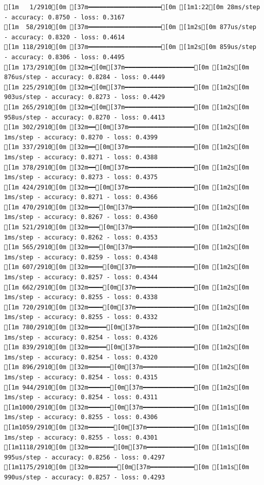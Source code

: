 \documentclass[
  letterpaper,
  DIV=11,
  numbers=noendperiod]{scrartcl}
\begin{document}
\begin{verbatim}
[1m   1/2910[0m [37m━━━━━━━━━━━━━━━━━━━━[0m [1m1:22[0m 28ms/step - accuracy: 0.8750 - loss: 0.3167
[1m  58/2910[0m [37m━━━━━━━━━━━━━━━━━━━━[0m [1m2s[0m 877us/step - accuracy: 0.8320 - loss: 0.4614 
[1m 118/2910[0m [37m━━━━━━━━━━━━━━━━━━━━[0m [1m2s[0m 859us/step - accuracy: 0.8306 - loss: 0.4495
[1m 173/2910[0m [32m━[0m[37m━━━━━━━━━━━━━━━━━━━[0m [1m2s[0m 876us/step - accuracy: 0.8284 - loss: 0.4449
[1m 225/2910[0m [32m━[0m[37m━━━━━━━━━━━━━━━━━━━[0m [1m2s[0m 903us/step - accuracy: 0.8273 - loss: 0.4429
[1m 265/2910[0m [32m━[0m[37m━━━━━━━━━━━━━━━━━━━[0m [1m2s[0m 958us/step - accuracy: 0.8270 - loss: 0.4413
[1m 302/2910[0m [32m━━[0m[37m━━━━━━━━━━━━━━━━━━[0m [1m2s[0m 1ms/step - accuracy: 0.8270 - loss: 0.4399  
[1m 337/2910[0m [32m━━[0m[37m━━━━━━━━━━━━━━━━━━[0m [1m2s[0m 1ms/step - accuracy: 0.8271 - loss: 0.4388
[1m 378/2910[0m [32m━━[0m[37m━━━━━━━━━━━━━━━━━━[0m [1m2s[0m 1ms/step - accuracy: 0.8273 - loss: 0.4375
[1m 424/2910[0m [32m━━[0m[37m━━━━━━━━━━━━━━━━━━[0m [1m2s[0m 1ms/step - accuracy: 0.8271 - loss: 0.4366
[1m 470/2910[0m [32m━━━[0m[37m━━━━━━━━━━━━━━━━━[0m [1m2s[0m 1ms/step - accuracy: 0.8267 - loss: 0.4360
[1m 521/2910[0m [32m━━━[0m[37m━━━━━━━━━━━━━━━━━[0m [1m2s[0m 1ms/step - accuracy: 0.8262 - loss: 0.4353
[1m 565/2910[0m [32m━━━[0m[37m━━━━━━━━━━━━━━━━━[0m [1m2s[0m 1ms/step - accuracy: 0.8259 - loss: 0.4348
[1m 607/2910[0m [32m━━━━[0m[37m━━━━━━━━━━━━━━━━[0m [1m2s[0m 1ms/step - accuracy: 0.8257 - loss: 0.4344
[1m 662/2910[0m [32m━━━━[0m[37m━━━━━━━━━━━━━━━━[0m [1m2s[0m 1ms/step - accuracy: 0.8255 - loss: 0.4338
[1m 720/2910[0m [32m━━━━[0m[37m━━━━━━━━━━━━━━━━[0m [1m2s[0m 1ms/step - accuracy: 0.8255 - loss: 0.4332
[1m 780/2910[0m [32m━━━━━[0m[37m━━━━━━━━━━━━━━━[0m [1m2s[0m 1ms/step - accuracy: 0.8254 - loss: 0.4326
[1m 839/2910[0m [32m━━━━━[0m[37m━━━━━━━━━━━━━━━[0m [1m2s[0m 1ms/step - accuracy: 0.8254 - loss: 0.4320
[1m 896/2910[0m [32m━━━━━━[0m[37m━━━━━━━━━━━━━━[0m [1m2s[0m 1ms/step - accuracy: 0.8254 - loss: 0.4315
[1m 944/2910[0m [32m━━━━━━[0m[37m━━━━━━━━━━━━━━[0m [1m2s[0m 1ms/step - accuracy: 0.8254 - loss: 0.4311
[1m1000/2910[0m [32m━━━━━━[0m[37m━━━━━━━━━━━━━━[0m [1m1s[0m 1ms/step - accuracy: 0.8255 - loss: 0.4306
[1m1059/2910[0m [32m━━━━━━━[0m[37m━━━━━━━━━━━━━[0m [1m1s[0m 1ms/step - accuracy: 0.8255 - loss: 0.4301
[1m1118/2910[0m [32m━━━━━━━[0m[37m━━━━━━━━━━━━━[0m [1m1s[0m 995us/step - accuracy: 0.8256 - loss: 0.4297
[1m1175/2910[0m [32m━━━━━━━━[0m[37m━━━━━━━━━━━━[0m [1m1s[0m 990us/step - accuracy: 0.8257 - loss: 0.4293

\end{verbatim}
\end{document}
